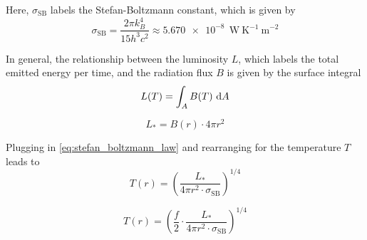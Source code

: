     Here, $\sigma_\text{SB}$ labels the Stefan-Boltzmann constant, which is given by 
    \begin{equation}
        \sigma_\text{SB}
            = \frac{2\pi k_B^4}{15h^3 c^2}
            \approx \SI{5.670e-8}{\ \watt\ \kelvin^{-1}\ \meter^{-2}}
    \end{equation}

    In general, the relationship between the luminosity $L$, which labels the total emitted energy 
    per time, and the radiation flux $B$ is given by the surface integral
    \begin{equation}
        L(T) = \int_A B(T) \ \text dA
    \end{equation}
    
    \begin{equation}
        L_* = B(r) \cdot 4\pi r^2
    \end{equation}

    Plugging in \cref{eq:stefan_boltzmann_law} and rearranging for the temperature $T$ leads to
    \begin{equation}
        T(r) = \left(
            \frac{L_*}{4\pi r^2 \cdot \sigma_\text{SB}}
        \right)^{1/4}
    \end{equation}

    \begin{equation}
    \boxed{
        T(r) = \left(
            \frac{f}{2}\cdot
            \frac{L_*}{4\pi r^2 \cdot \sigma_\text{SB}}
        \right)^{1/4}
    }
    \end{equation}

    


